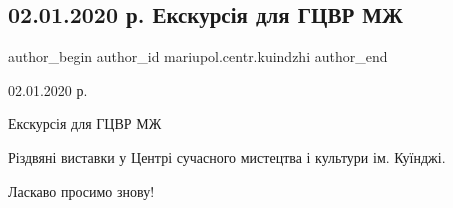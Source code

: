  
 
 
 
 

\subsection{02.01.2020 р. Екскурсія для ГЦВР МЖ}
\label{sec:03_01_2020.fb.mariupol.centr.kuindzhi.3.02012020_ekskursia_dlja_gcvr_mzh}

\ifcmt
 author_begin
   author_id mariupol.centr.kuindzhi
 author_end
\fi

02.01.2020 р.

Екскурсія для ГЦВР МЖ

Різдвяні виставки у Центрі сучасного мистецтва і культури ім. Куїнджі.

Ласкаво просимо знову!
